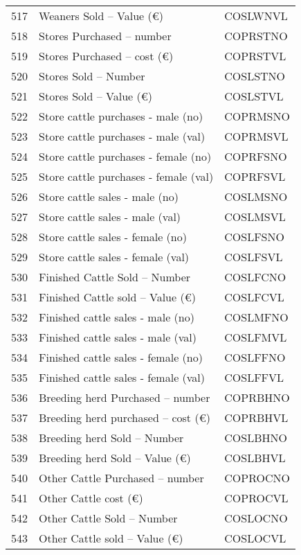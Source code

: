 \documentclass{article}\usepackage{graphicx, color}
\begin{document}
\begin{flushleft}
\begin{table}[ht]
\begin{center}
\begin{tabular}{rll}
  517 & Weaners Sold      -- Value  (€) & COSLWNVL \\ 
  518 & Stores Purchased -- number & COPRSTNO \\ 
  519 & Stores Purchased -- cost   (€) & COPRSTVL \\ 
  520 & Stores Sold -- Number & COSLSTNO \\ 
  521 & Stores Sold -- Value     (€) & COSLSTVL \\ 
  522 & Store cattle purchases - male   (no) & COPRMSNO \\ 
  523 & Store cattle purchases - male   (val) & COPRMSVL \\ 
  524 & Store cattle purchases - female (no) & COPRFSNO \\ 
  525 & Store cattle purchases - female (val) & COPRFSVL \\ 
  526 & Store cattle sales - male       (no) & COSLMSNO \\ 
  527 & Store cattle sales -  male      (val) & COSLMSVL \\ 
  528 & Store cattle sales - female     (no) & COSLFSNO \\ 
  529 & Store cattle sales - female     (val) & COSLFSVL \\ 
  530 & Finished Cattle Sold -- Number & COSLFCNO \\ 
  531 & Finished Cattle sold -- Value  (€) & COSLFCVL \\ 
  532 & Finished cattle sales - male    (no) & COSLMFNO \\ 
  533 & Finished cattle sales - male    (val) & COSLFMVL \\ 
  534 & Finished cattle sales - female  (no) & COSLFFNO \\ 
  535 & Finished cattle sales - female  (val) & COSLFFVL \\ 
  536 & Breeding herd Purchased -- number & COPRBHNO \\ 
  537 & Breeding herd purchased -- cost   (€) & COPRBHVL \\ 
  538 & Breeding herd Sold -- Number & COSLBHNO \\ 
  539 & Breeding herd Sold -- Value    (€) & COSLBHVL \\ 
  540 & Other Cattle Purchased -- number & COPROCNO \\ 
  541 & Other Cattle cost        (€) & COPROCVL \\ 
  542 & Other Cattle Sold -- Number & COSLOCNO \\ 
  543 & Other Cattle sold -- Value  (€) & COSLOCVL \\ 

\end{tabular}
\end{center}
\end{table}
\end{flushleft}
\end{document}
